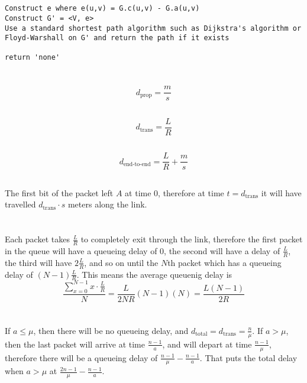 \documentclass[12pt]{article}
\begin{document}
\section{}
\begin{verbatim}
Construct e where e(u,v) = G.c(u,v) - G.a(u,v)
Construct G' = <V, e>
Use a standard shortest path algorithm such as Dijkstra's algorithm or
Floyd-Warshall on G' and return the path if it exists

return 'none'
\end{verbatim}

\section{}
\subsection{}
$$d_{\text{prop}} = \frac{m}{s}$$
\subsection{}
$$d_{\text{trans}} = \frac{L}{R}$$
\subsection{}
$$d_{\text{end-to-end}} = \frac{L}{R} + \frac{m}{s}$$
\subsection{}
The first bit of the packet left $A$ at time 0, therefore at time $t =
d_{\text{trans}}$ it will have travelled $d_{\text{trans}} \cdot s$ meters along
the link.

\section{}
Each packet takes $\frac{L}{R}$ to completely exit through the link, therefore
the first packet in the queue will have a queueing delay of $0$, the second will
have a delay of $\frac{L}{R}$, the third will have $2\frac{L}{R}$, and so on
until the $N$th packet which has a queueing delay of $(N - 1)\frac{L}{R}$.  This
means the average queuenig delay is 
$$\frac{\sum_{x = 0}^{N - 1} x\cdot\frac{L}{R}}{N} = \frac{L}{2NR}(N - 1)(N) =
\frac{L(N - 1)}{2R}$$

\section{}
If $a \leq \mu$, then there will be no queueing delay, and $d_{\text{total}} =
d_\text{trans} = \frac{n}{\mu}$.  If $a > \mu$, then the last packet will arrive
at time $\frac{n - 1}{a}$, and will depart at time $\frac{n - 1}{\mu}$, therefore there
will be a queueing delay of $\frac{n - 1}{\mu} - \frac{n - 1}{a}$.  That puts
the total delay when $a > \mu$ at $\frac{2n - 1}{\mu} - \frac{n -1}{a}$.
\end{document}
